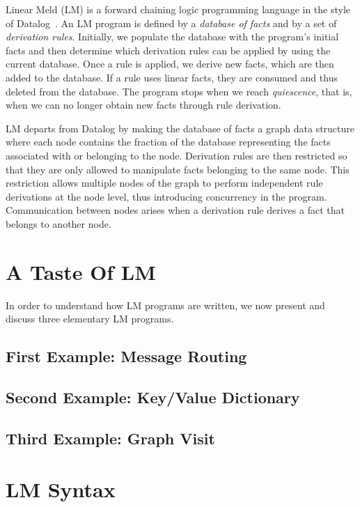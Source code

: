 
Linear Meld (LM) is a forward chaining logic programming language in the style
of Datalog~\cite{Ullman:1990:PDK:533142}. An LM program is defined by a
\emph{database of facts} and by a set of \emph{derivation rules}.  Initially, we
populate the database with the program's initial facts and then determine which
derivation rules can be applied by using the current database. Once a rule is
applied, we derive new facts, which are then added to the database.  If a rule
uses linear facts, they are consumed and thus deleted from the database.  The
program stops when we reach \emph{quiescence}, that is, when we can no longer
obtain new facts through rule derivation.

LM departs from Datalog by making the database of facts a graph data structure
where each node contains the fraction of the database representing the facts
associated with or belonging to the node. Derivation rules are then restricted
so that they are only allowed to manipulate facts belonging to the same node.
This restriction allows multiple nodes of the graph to perform independent rule
derivations at the node level, thus introducing concurrency in the program.
Communication between nodes arises when a derivation rule derives a fact that
belongs to another node.

\section{A Taste Of LM}

In order to understand how LM programs are written, we now present and discuss
three elementary LM programs.

\subsection{First Example: Message Routing}\label{section:language:message}


\subsection{Second Example: Key/Value Dictionary}\label{sec:language:key_value}


\subsection{Third Example: Graph Visit}


\section{LM Syntax}

